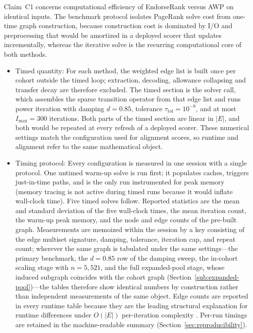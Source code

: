 
Claim~C1 concerns computational efficiency of EndorseRank versus AWP on identical inputs. The benchmark protocol isolates PageRank solve cost from one-time graph construction, because construction cost is dominated by I/O and preprocessing that would be amortized in a deployed scorer that updates incrementally, whereas the iterative solve is the recurring computational core of both methods.

\begin{itemize}
\item Timed quantity: For each method, the weighted edge list is built once per cohort outside the timed loop; extraction, decoding, allowance collapsing and transfer decay are therefore excluded. The timed section is the solver call, which assembles the sparse transition operator from that edge list and runs power iteration with damping $d=0.85$, tolerance $\tau_{\mathrm{tol}}=10^{-8}$, and at most $I_{\max}=300$ iterations. Both parts of the timed section are linear in $|E|$, and both would be repeated at every refresh of a deployed scorer. These numerical settings match the configuration used for alignment scores, so runtime and alignment refer to the same mathematical object.

\item Timing protocol: Every configuration is measured in one session with a single protocol. One untimed warm-up solve is run first; it populates caches, triggers just-in-time paths, and is the only run instrumented for peak memory (memory tracing is not active during timed runs because it would inflate wall-clock time). Five timed solves follow. Reported statistics are the mean and standard deviation of the five wall-clock times, the mean iteration count, the warm-up peak memory, and the node and edge counts of the pre-built graph. Measurements are memoized within the session by a key consisting of the edge multiset signature, damping, tolerance, iteration cap, and repeat count; wherever the same graph is tabulated under the same settings---the primary benchmark, the $d=0.85$ row of the damping sweep, the in-cohort scaling stage with $n=5{,}521$, and the full expanded-pool stage, whose induced subgraph coincides with the cohort graph (Section~\ref{sub:expanded-pool})---the tables therefore show identical numbers by construction rather than independent measurements of the same object. Edge counts are reported in every runtime table because they are the leading structural explanation for runtime differences under $O(|E|)$ per-iteration complexity . Per-run timings are retained in the machine-readable summary (Section~\ref{sec:reproducibility}).


\end{itemize}
